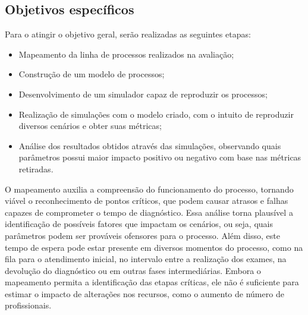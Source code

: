 \documentclass[
    12pt,
    openright,
    oneside,
    a4paper,
    english,
    brazil
]{abntex2}
\begin{document}
\subsection{Objetivos específicos}


Para o atingir o objetivo geral, serão realizadas as seguintes etapas:
\begin{itemize}
		\item Mapeamento da linha de processos realizados na avaliação;
		\item Construção de um modelo de processos;
		\item Desenvolvimento de um simulador capaz de reproduzir os processos;
		\item Realização de simulações com o modelo criado, com o intuito de reproduzir diversos cenários e obter suas métricas;
		\item Análise dos resultados obtidos através das simulações, observando quais parâmetros possui maior impacto positivo ou negativo com base nas métricas retiradas.
\end{itemize}

O mapeamento auxilia a compreensão do funcionamento do processo, tornando viável o reconhecimento de pontos críticos, que podem causar atrasos e falhas capazes de comprometer o tempo de diagnóstico. Essa análise torna plausível a identificação de possíveis fatores que impactam os cenários, ou seja, quais parâmetros podem ser prováveis ofensores para o processo. Além disso, este tempo de espera pode estar presente em diversos momentos do processo, como na fila para o atendimento inicial, no intervalo entre a realização dos exames, na devolução do diagnóstico ou em outras fases intermediárias. Embora o mapeamento permita a identificação das etapas críticas, ele não é suficiente para estimar o impacto de alterações nos recursos, como o aumento de número de profissionais.
\end{document}
